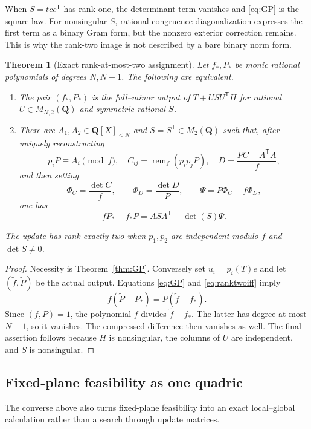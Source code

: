 \documentclass[11pt,reqno]{amsart}
\newtheorem{theorem}{Theorem}[section]
\theoremstyle{definition}
\theoremstyle{remark}
\DeclareMathOperator{\rem}{rem}
\newcommand{\Q}{\mathbf Q}
\begin{document}
When $S=tcc^{\mathsf T}$ has rank one, the determinant term vanishes and
\eqref{eq:GP} is the square law.  For nonsingular $S$, rational congruence
diagonalization expresses the first term as a binary Gram form, but the
nonzero exterior correction remains.  This is why the rank-two image is not
described by a bare binary norm form.

\begin{theorem}[Exact rank-at-most-two assignment]\label{thm:ranktwoiff}
Let $f_*,P_*$ be monic rational polynomials of degrees $N,N-1$.  The following
are equivalent.
\begin{enumerate}[label=\textup{(\alph*)}]
\item The pair $(f_*,P_*)$ is the full--minor output of
$T+USU^{\mathsf T}H$ for rational $U\in M_{N,2}(\Q)$ and symmetric rational
$S$.
\item There are $A_1,A_2\in\Q[X]_{<N}$ and $S=S^{\mathsf T}\in M_2(\Q)$
such that, after uniquely reconstructing
\[
 p_iP\equiv A_i\pmod f,\quad
 C_{ij}=\rem_f(p_ip_jP),\quad
 D=\frac{PC-A^{\mathsf T}A}{f},
 \]
and then setting
\[
 \Phi_C=\frac{\det C}{f},\qquad
 \Phi_D=\frac{\det D}{P},\qquad
 \Psi=P\Phi_C-f\Phi_D,
\]
one has
\begin{equation}\label{eq:ranktwoiff}
 fP_*-f_*P=ASA^{\mathsf T}-\det(S)\Psi.
\end{equation}
\end{enumerate}
The update has rank exactly two when $p_1,p_2$ are independent modulo $f$
and $\det S\ne0$.
\end{theorem}

\begin{proof}
Necessity is Theorem~\ref{thm:GP}.  Conversely set $u_i=p_i(T)e$ and let
$(\widetilde f,\widetilde P)$ be the actual output.  Equations
\eqref{eq:GP} and \eqref{eq:ranktwoiff} imply
\[
 f(\widetilde P-P_*)=P(\widetilde f-f_*).
\]
Since $(f,P)=1$, the polynomial $f$ divides $\widetilde f-f_*$.  The latter
has degree at most $N-1$, so it vanishes.  The compressed difference then
vanishes as well.  The final assertion follows because $H$ is nonsingular,
the columns of $U$ are independent, and $S$ is nonsingular.
\end{proof}

\subsection{Fixed-plane feasibility as one quadric}

The converse above also turns fixed-plane feasibility into an exact
local--global calculation rather than a search through update matrices.
\end{document}
